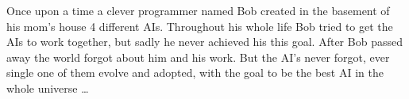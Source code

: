 \clearpage
\thispagestyle{empty}
\vspace*{\fill}
\begin{center}
\begin{minipage}{1.0\textwidth}
Once upon a time a clever programmer named Bob created in the basement of his mom's house 4 different AIs. Throughout his whole life Bob tried to get the AIs to work together, but sadly he never achieved his this goal. After Bob passed away the world forgot about him and his work. But the AI's never forgot, ever single one of them evolve and adopted, with the goal to be the best AI in the whole universe \ldots
\end{minipage}
\end{center}
\vfill %
\clearpage
